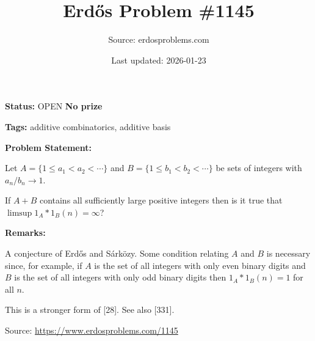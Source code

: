 \documentclass{article}
\title{Erd\H{o}s Problem \#1145}
\date{Last updated: 2026-01-23}
\author{Source: erdosproblems.com}
\begin{document}
\maketitle

\noindent\textbf{Status:} OPEN \quad \textbf{No prize}

\noindent\textbf{Tags:} additive combinatorics, additive basis

\medskip
\noindent\textbf{Problem Statement:}

Let $A=\{1\leq a_1<a_2<\cdots\}$ and $B=\{1\leq b_1<b_2<\cdots\}$ be sets of integers with $a_n/b_n\to 1$. 

If $A+B$ contains all sufficiently large positive integers then is it true that $\limsup 1_A\ast 1_B(n)=\infty$?

\bigskip
\noindent\textbf{Remarks:}

A conjecture of Erd\H{o}s and S\'{a}rk\"{o}zy. Some condition relating $A$ and $B$ is necessary since, for example, if $A$ is the set of all integers with only even binary digits and $B$ is the set of all integers with only odd binary digits then $1_A\ast 1_B(n)=1$ for all $n$.

This is a stronger form of [28]. See also [331].

\bigskip
\noindent\small{Source: \url{https://www.erdosproblems.com/1145}}
\end{document}
